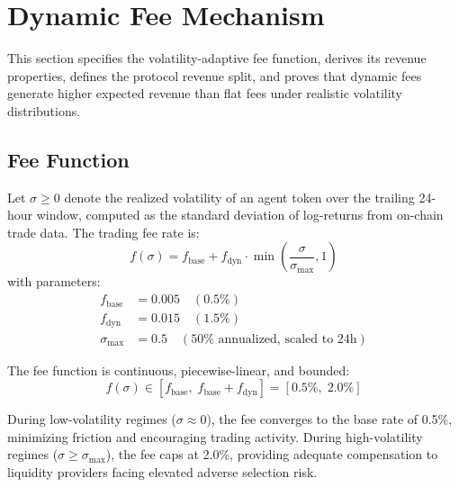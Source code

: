 \section{Dynamic Fee Mechanism}
\label{sec:dynamic-fees}

This section specifies the volatility-adaptive fee function, derives its
revenue properties, defines the protocol revenue split, and proves that dynamic
fees generate higher expected revenue than flat fees under realistic volatility
distributions.

\subsection{Fee Function}
\label{subsec:fee-function}

\begin{definition}
\label{def:dynamic-fee}
Let $\sigma \geq 0$ denote the realized volatility of an agent token over the
trailing 24-hour window, computed as the standard deviation of log-returns
from on-chain trade data. The trading fee rate is:
\begin{equation}
  f(\sigma) = f_{\text{base}} + f_{\text{dyn}} \cdot \min\!\left(\frac{\sigma}{\sigma_{\max}}, 1\right)
  \label{eq:fee-function}
\end{equation}
with parameters:
\begin{align}
  f_{\text{base}} &= 0.005 \quad (0.5\%) \label{eq:fbase} \\
  f_{\text{dyn}} &= 0.015 \quad (1.5\%) \label{eq:fdyn} \\
  \sigma_{\max} &= 0.5 \quad (50\% \text{ annualized, scaled to 24h}) \label{eq:sigmax}
\end{align}
\end{definition}

The fee function is continuous, piecewise-linear, and bounded:
\begin{equation}
  f(\sigma) \in [f_{\text{base}},\; f_{\text{base}} + f_{\text{dyn}}] = [0.5\%,\; 2.0\%]
  \label{eq:fee-range}
\end{equation}

During low-volatility regimes ($\sigma \approx 0$), the fee converges to the
base rate of 0.5\%, minimizing friction and encouraging trading activity.
During high-volatility regimes ($\sigma \geq \sigma_{\max}$), the fee caps at
2.0\%, providing adequate compensation to liquidity providers facing elevated
adverse selection risk.

